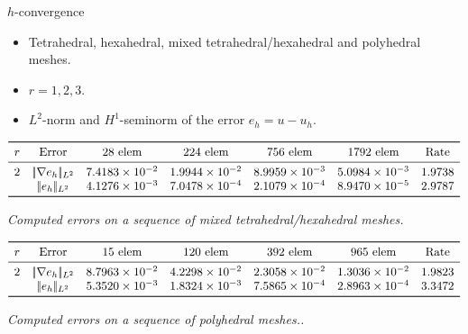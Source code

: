 \documentclass{beamer}
\begin{document}
\begin{frame}{$h$-convergence}
	\begin{itemize}
		\item Tetrahedral, hexahedral, mixed tetrahedral/hexahedral and
		polyhedral meshes.
		\item $r = 1,2,3$.
		\item $L^2$-norm and $H^1$-seminorm of the error $e_h = u - u_h$.
	\end{itemize}

	\begin{table} \tiny
		\centering
		\[
		\begin{array}{ccccccc}
		\toprule
		r & \text{Error} & \text{28 elem} & \text{224 elem} & \text{756 elem} &
		\text{1792 elem} & \text{Rate} \\
		\midrule
		2 & |\!|\nabla e_{h}|\!|_{L^2} & 7.4183 \times 10^{-2} & 1.9944 \times
		10^{-2} & 8.9959 \times 10^{-3} & 5.0984 \times 10^{-3} & 1.9738\\
		& |\!|e_{h}|\!|_{L^2} & 4.1276 \times 10^{-3} & 7.0478 \times 10^{-4} &
		2.1079 \times 10^{-4} &
		8.9470 \times 10^{-5} & 2.9787\\
		\bottomrule
		\end{array}
		\]
		\caption{\textit{Computed errors on a sequence of mixed
		tetrahedral/hexahedral meshes.}}
	\[
	\begin{array}{ccccccc}
	\toprule
	r & \text{Error} & \text{15 elem} & \text{120 elem} & \text{392 elem} &
	\text{965 elem} & \text{Rate} \\
	\midrule
	2 & |\!|\nabla e_{h}|\!|_{L^2} & 8.7963 \times 10^{-2} & 4.2298 \times
	10^{-2} & 2.3058 \times 10^{-2} & 1.3036 \times 10^{-2} & 1.9823\\
	& |\!|e_{h}|\!|_{L^2} & 5.3520 \times 10^{-3} & 1.8324 \times 10^{-3} &
	7.5865 \times 10^{-4} & 2.8963 \times 10^{-4} & 3.3472\\
	\bottomrule
	\end{array}
	\]
	\caption{\textit{Computed errors on a sequence of polyhedral meshes..}}
\end{table}

\end{frame}
\end{document}
